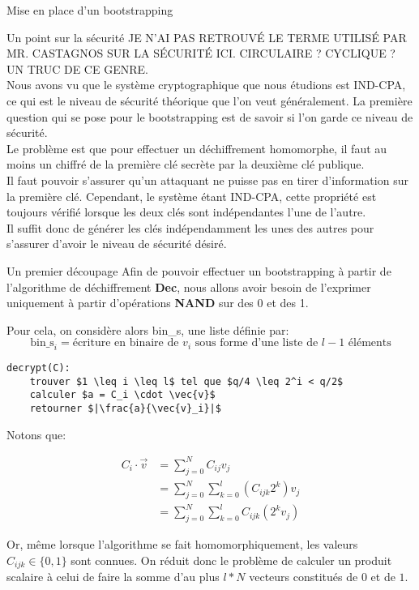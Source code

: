 \begin{section}{Mise en place d'un bootstrapping}
\begin{subsection}{Un point sur la sécurité}
JE N'AI PAS RETROUVÉ LE TERME UTILISÉ PAR MR. CASTAGNOS SUR LA SÉCURITÉ ICI.
CIRCULAIRE ? CYCLIQUE ? UN TRUC DE CE GENRE.\\
Nous avons vu que le système cryptographique que nous étudions est IND-CPA, ce qui est le niveau de sécurité théorique que l'on veut généralement. La première question qui se pose pour le bootstrapping est de savoir si l'on garde ce niveau de sécurité.\\
Le problème est que pour effectuer un déchiffrement homomorphe, il faut au moins un chiffré de la première clé secrète par la deuxième clé publique. \\
Il faut pouvoir s'assurer qu'un attaquant ne puisse pas en tirer d'information sur la première clé. Cependant, le système étant IND-CPA, cette propriété est toujours vérifié lorsque les deux clés sont indépendantes l'une de l'autre. \\
Il suffit donc de générer les clés indépendamment les unes des autres pour s'assurer d'avoir le niveau de sécurité désiré.
\end{subsection}
\begin{subsection}{Un premier découpage}
Afin de pouvoir effectuer un bootstrapping à partir de l'algorithme de déchiffrement \textbf{Dec}, nous allons avoir besoin de l'exprimer uniquement à partir d'opérations \textbf{NAND} sur des 0 et des 1.

Pour cela, on considère alors bin\_s, une liste définie par:
\[{\text{bin\_s}}_i = \text{écriture en binaire de $v_i$ sous forme d'une liste de $l-1$ éléments}\]

\begin{lstlisting}
decrypt(C):
	trouver $1 \leq i \leq l$ tel que $q/4 \leq 2^i < q/2$
	calculer $a = C_i \cdot \vec{v}$
	retourner $|\frac{a}{\vec{v}_i}|$
\end{lstlisting}

Notons que:

\begin{align*}
	C_i \cdot \vec{v} &= \sum_{j=0}^N C_{ij} v_j \\
	&= \sum_{j=0}^N \sum_{k=0}^l \left( C_{ijk} 2^k \right) v_j \\
	&= \sum_{j=0}^N \sum_{k=0}^l C_{ijk} (2^k v_j)
\end{align*}

Or, même lorsque l'algorithme se fait homomorphiquement, les valeurs
$C_{ijk} \in \{ 0,1 \}$ sont connues. 
On réduit donc le problème de calculer un produit scalaire à celui de faire la
somme d'au plus $l * N$ vecteurs constitués de $0$ et de $1$.



\end{subsection}
\end{section}
